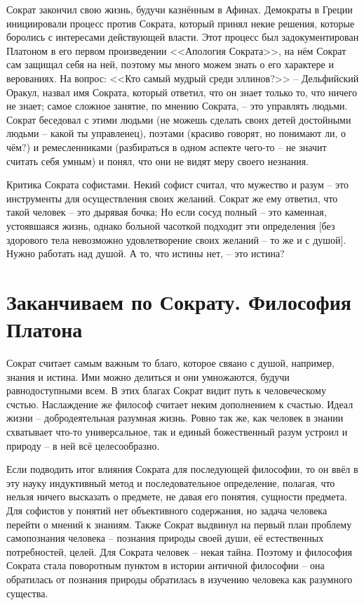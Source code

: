\documentclass[a4paper, 12pt]{book} %
\begin{document}
 Сократ закончил свою жизнь, будучи казнённым в Афинах. Демократы в Греции инициировали процесс против Сократа, который принял некие решения, которые боролись с интересами действующей власти. Этот процесс был задокументирован Платоном в его первом произведении <<Апология Сократа>>, на нём Сократ сам защищал себя на ней, поэтому мы много можем знать о его характере и верованиях. На вопрос: <<Кто самый мудрый среди эллинов?>> -- Дельфийский Оракул, назвал имя Сократа, который ответил, что он знает только то, что ничего не знает; самое сложное занятие, по мнению Сократа, -- это управлять людьми. Сократ беседовал с этими людьми (не можешь сделать своих детей достойными людьми -- какой ты управленец), поэтами (красиво говорят, но понимают ли, о чём?) и ремесленниками (разбираться в одном аспекте чего-то -- не значит считать себя умным) и понял, что они не видят меру своего незнания.
 
Критика Сократа софистами. Некий софист считал, что мужество и разум -- это инструменты для осуществления своих желаний. Сократ же ему ответил, что такой человек -- это дырявая бочка; Но если сосуд полный -- это каменная, устоявшаяся жизнь, однако больной часоткой подходит эти определения [без здорового тела невозможно удовлетворение своих желаний -- то же и с душой]. Нужно работать над душой. А то, что истины нет, -- это истина? 

\section{Заканчиваем по Сократу. Философия Платона}

Сократ считает самым важным то благо, которое свяано с душой, например, знания и истина. Ими можно делиться и они умножаются, будучи равнодоступными всем. В этих благах Сократ видит путь к человеческому счстью. Наслаждение же философ считает неким дополнением к счастью. Идеал жизни -- добродеятельная разумная жизнь. Ровно так же, как человек в знании схватывает что-то универсальное, так и единый божественный разум устроил и природу -- в ней всё целесообразно.


Если подводить итог влияния Сократа для последующей философии, то он ввёл в эту науку индуктивный метод и последовательное определение, полагая, что нельзя ничего высказать о предмете, не давая его понятия, сущности предмета.
Для софистов у понятий нет объективного содержания, но задача человека перейти о мнений к знаниям. Также Сократ выдвинул на первый план проблему самопознания человека -- познания природы своей души, её естественных потребностей, целей. Для Сократа человек -- некая тайна. Поэтому и философия Сократа стала поворотным пунктом в истории античной философии -- она обратилась от познания природы обратилась в изучению человека как разумного существа.
\end{document}
